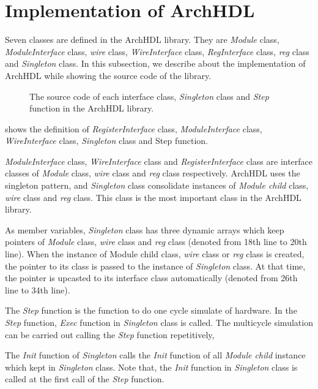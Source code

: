 \section{Implementation of ArchHDL} \label{ss:implementation}

Seven classes are defined in the ArchHDL library.
They are \textit{Module} class, \textit{ModuleInterface} class, \textit{wire} class, \textit{WireInterface} class, \textit{RegInterface} class, \textit{reg} class and \textit{Singleton} class.
In this subsection, we describe about the implementation of ArchHDL while showing the source code of the library.

\begin{figure}[p]
 
 \caption{The source code of each interface class, \textit{Singleton} class and \textit{Step} function in the ArchHDL library.}
 \label{src:class_singleton}
\end{figure}

 shows the definition of \textit{RegisterInterface} class, \textit{ModuleInterface} class, \textit{WireInterface} class, \textit{Singleton} class and Step function.

\textit{ModuleInterface} class, \textit{WireInterface} class and \textit{RegisterInterface} class are interface classes of \textit{Module} class, \textit{wire} class and \textit{reg} class respectively.
ArchHDL uses the singleton pattern, and \textit{Singleton} class consolidate instances of \textit{Module child} class, \textit{wire} class and \textit{reg} class.
This class is the most important class in the ArchHDL library.

As member variables, \textit{Singleton} class has three dynamic arrays which keep pointers of \textit{Module} class, \textit{wire} class and \textit{reg} class (denoted from 18th line to 20th line).
When the instance of {Module child} class, \textit{wire} class or \textit{reg} class is created, the pointer to its class is passed to the instance of \textit{Singleton} class.
At that time, the pointer is upcasted to its interface class automatically (denoted from 26th line to 34th line).

The \textit{Step} function is the function to do one cycle simulate of hardware.
In the \textit{Step} function, \textit{Exec} function in \textit{Singleton} class is called.
The multicycle simulation can be carried out calling the \textit{Step} function repetitively,

The \textit{Init} function of \textit{Singleton} calls the \textit{Init} function of all \textit{Module child} instance which kept in \textit{Singleton} class.
Note that, the \textit{Init} function in \textit{Singleton} class is called at the first call of the \textit{Step} function.


